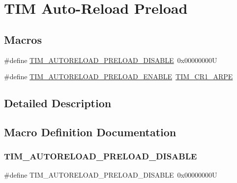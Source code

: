 \hypertarget{group___t_i_m___auto_reload_preload}{}\section{T\+IM Auto-\/\+Reload Preload}
\label{group___t_i_m___auto_reload_preload}
\subsection*{Macros}
\begin{DoxyCompactItemize}
\item 
\#define \hyperlink{group___t_i_m___auto_reload_preload_ga4d0cf7e2800d0ab10f3f0ebfac11c9c7}{T\+I\+M\+\_\+\+A\+U\+T\+O\+R\+E\+L\+O\+A\+D\+\_\+\+P\+R\+E\+L\+O\+A\+D\+\_\+\+D\+I\+S\+A\+B\+LE}~0x00000000U
\item 
\#define \hyperlink{group___t_i_m___auto_reload_preload_gaaa36f0c74b1d1ec83b0c105bfedfa309}{T\+I\+M\+\_\+\+A\+U\+T\+O\+R\+E\+L\+O\+A\+D\+\_\+\+P\+R\+E\+L\+O\+A\+D\+\_\+\+E\+N\+A\+B\+LE}~\hyperlink{group___peripheral___registers___bits___definition_ga4a3ad409f6b147cdcbafbfe29102f3fd}{T\+I\+M\+\_\+\+C\+R1\+\_\+\+A\+R\+PE}
\end{DoxyCompactItemize}


\subsection{Detailed Description}


\subsection{Macro Definition Documentation}
\mbox{\label{group___t_i_m___auto_reload_preload_ga4d0cf7e2800d0ab10f3f0ebfac11c9c7}} 
\subsubsection{\texorpdfstring{T\+I\+M\+\_\+\+A\+U\+T\+O\+R\+E\+L\+O\+A\+D\+\_\+\+P\+R\+E\+L\+O\+A\+D\+\_\+\+D\+I\+S\+A\+B\+LE}{TIM\_AUTORELOAD\_PRELOAD\_DISABLE}}
{\footnotesize\ttfamily \#define T\+I\+M\+\_\+\+A\+U\+T\+O\+R\+E\+L\+O\+A\+D\+\_\+\+P\+R\+E\+L\+O\+A\+D\+\_\+\+D\+I\+S\+A\+B\+LE~0x00000000U}

